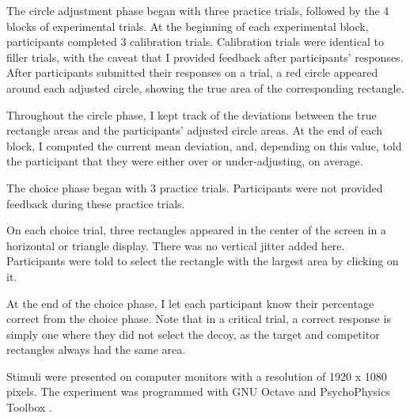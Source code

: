 {{The circle adjustment phase began with three practice trials, followed by the 4 blocks of experimental trials. At the beginning of each experimental block, participants completed 3 calibration trials. Calibration trials were identical to filler trials, with the caveat that I provided feedback after participants' responses. After participants submitted their responses on a trial, a red circle appeared around each adjusted circle, showing the true area of the corresponding rectangle. 

Throughout the circle phase, I kept track of the deviations between the true rectangle areas and the participants' adjusted circle areas. At the end of each block, I computed the current mean deviation, and, depending on this value, told the participant that they were either over or under-adjusting, on average.

The choice phase began with 3 practice trials. Participants were not provided feedback during these practice trials. 

On each choice trial, three rectangles appeared in the center of the screen in a horizontal or triangle display. There was no vertical jitter added here. Participants were told to select the rectangle with the largest area by clicking on it.

At the end of the choice phase, I let each participant know their percentage correct from the choice phase. Note that in a critical trial, a correct response is simply one where they did not select the decoy, as the target and competitor rectangles always had the same area.

Stimuli were presented on computer monitors with a resolution of 1920 x 1080 pixels. The experiment was programmed with GNU Octave \parencite{octave} and PsychoPhysics Toolbox \parencite{brainardPsychophysicsToolbox1997}. 

}}
